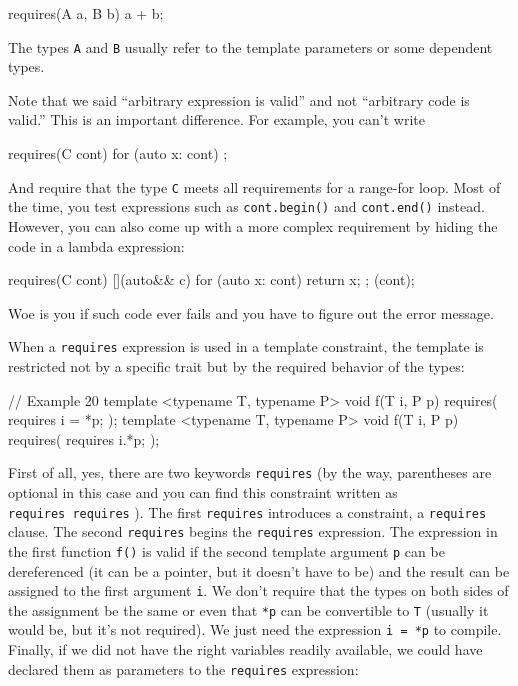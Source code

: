 \begin{code}
requires(A a, B b) { a + b; }
\end{code}

The types \texttt{A} and \texttt{B} usually refer to the template parameters or some dependent types.

Note that we said ``arbitrary expression is valid'' and not ``arbitrary code is valid.'' This is an important difference. For example, you can't write

\begin{code}
requires(C cont) { for (auto x: cont) {}; }
\end{code}

And require that the type \texttt{C} meets all requirements for a range-for loop. Most of the time, you test expressions such as \texttt{cont.begin()} and \texttt{cont.end()} instead. However, you can also come up with a more complex requirement by hiding the code in a lambda expression:

\begin{code}
requires(C cont) {
  [](auto&& c) {
    for (auto x: cont) { return x; };
  }(cont);
}
\end{code}

Woe is you if such code ever fails and you have to figure out the error message.

When a \texttt{requires} expression is used in a template constraint, the template is restricted not by a specific trait but by the required behavior of the types:

\begin{code}
// Example 20
template <typename T, typename P>
void f(T i, P p) requires( requires { i = *p; } );
template <typename T, typename P>
void f(T i, P p) requires( requires { i.*p; } );
\end{code}

First of all, yes, there are two keywords \texttt{requires} (by the way, parentheses are optional in this case and you can find this constraint written as \texttt{requires\ requires} ). The first \texttt{requires} introduces a constraint, a \texttt{requires} clause. The second \texttt{requires} begins the \texttt{requires} expression. The expression in the first function \texttt{f()} is valid if the second template argument \texttt{p} can be dereferenced (it can be a pointer, but it doesn't have to be) and the result can be assigned to the first argument \texttt{i}. We don't require that the types on both sides of the assignment be the same or even that \texttt{*p} can be convertible to \texttt{T} (usually it would be, but it's not required). We just need the expression \texttt{i\ =\ *p} to compile. Finally, if we did not have the right variables readily available, we could have declared them as parameters to the \texttt{requires} expression:

